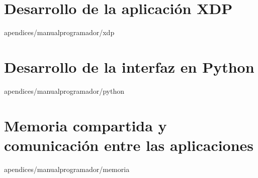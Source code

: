 \documentclass[epsbased,copyright,final,printable,covers,extendedindex,firstnumbered,tfg,gnuplot]{tfgtfmthesisuam}
\begin{document}
    \section{Desarrollo de la aplicación XDP\label{SEC:ENTORNOC}}{apendices/manualprogramador/xdp}
    \section{Desarrollo de la interfaz en Python\label{SEC:ENTORNOPYTHON}}{apendices/manualprogramador/python}
    \section{Memoria compartida y comunicación entre las aplicaciones\label{SEC:ENTORNOPYTHON}}{apendices/manualprogramador/memoria}
\end{document}
